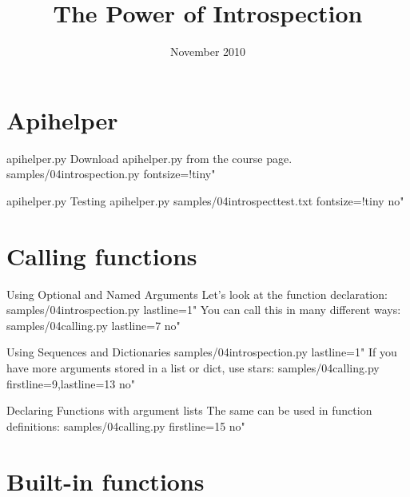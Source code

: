 \documentclass{pyslides}
\title{The Power of Introspection}
\date{November 2010}
\begin{document}
\begin{frame}\titlepage\end{frame}

\section{Apihelper}

\begin{frame}[fragile]{apihelper.py}
Download apihelper.py from the course page.
\bigskip
 samples/04introspection.py fontsize=!tiny"
\end{frame}

\begin{frame}[fragile]{apihelper.py}
Testing apihelper.py
\bigskip
 samples/04introspecttest.txt fontsize=!tiny no"
\end{frame}

\section{Calling functions}

\begin{frame}[fragile]{Using Optional and Named Arguments}
Let's look at the function declaration:
 samples/04introspection.py lastline=1"
\bigskip
You can call this in many different ways:
 samples/04calling.py lastline=7 no"
\end{frame}

\begin{frame}[fragile]{Using Sequences and Dictionaries}
 samples/04introspection.py lastline=1"
\bigskip
If you have more arguments stored in a list or dict, use stars:
 samples/04calling.py firstline=9,lastline=13 no"
\end{frame}

\begin{frame}[fragile]{Declaring Functions with argument lists}
The same can be used in function definitions:
 samples/04calling.py firstline=15 no"
\end{frame}

\section{Built-in functions}
\end{document}
